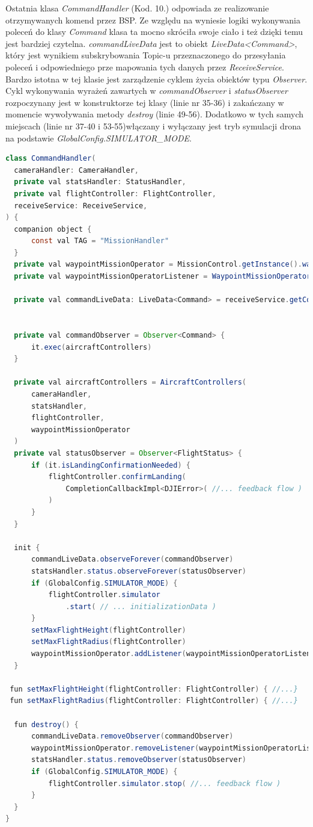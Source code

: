 Ostatnia klasa \textit{CommandHandler} (Kod. 10.) odpowiada ze realizowanie otrzymywanych komend przez BSP. Ze względu na wyniesie logiki wykonywania poleceń do klasy \textit{Command} klasa ta mocno skróciła swoje ciało i też dzięki temu jest bardziej czytelna. \textit{commandLiveData} jest to obiekt \textit{LiveData<Command>}, który jest wynikiem subskrybowania Topic-u przeznaczonego do przesyłania poleceń i odpowiedniego prze mapowania tych danych przez \textit{ReceiveService}. Bardzo istotna w tej klasie jest zarządzenie cyklem życia obiektów typu \textit{Observer}. Cykl wykonywania wyrażeń zawartych w \textit{commandObserver} i \textit{statusObserver} rozpoczynany jest w konstruktorze tej klasy (linie nr 35-36) i zakańczany w momencie wywoływania metody \textit{destroy} (linie 49-56). Dodatkowo w tych samych miejscach (linie nr 37-40 i 53-55)włączany i wyłączany jest tryb symulacji drona na podstawie \textit{GlobalConfig.SIMULATOR\_MODE}.

\begin{lstlisting}[language=Java, caption=Klasa \textit{CommandHandler}]
class CommandHandler(
  cameraHandler: CameraHandler,
  private val statsHandler: StatusHandler,
  private val flightController: FlightController,
  receiveService: ReceiveService,
) {
  companion object {
      const val TAG = "MissionHandler"
  }
  private val waypointMissionOperator = MissionControl.getInstance().waypointMissionOperator
  private val waypointMissionOperatorListener = WaypointMissionOperatorListenerImpl()

  private val commandLiveData: LiveData<Command> = receiveService.getCommand()


  private val commandObserver = Observer<Command> {
      it.exec(aircraftControllers)
  }

  private val aircraftControllers = AircraftControllers(
      cameraHandler,
      statsHandler,
      flightController,
      waypointMissionOperator
  )
  private val statusObserver = Observer<FlightStatus> {
      if (it.isLandingConfirmationNeeded) {
          flightController.confirmLanding(
              CompletionCallbackImpl<DJIError>( //... feedback flow )
          )
      }
  }

  init {
      commandLiveData.observeForever(commandObserver)
      statsHandler.status.observeForever(statusObserver)
      if (GlobalConfig.SIMULATOR_MODE) {
          flightController.simulator
              .start( // ... initializationData )
      }
      setMaxFlightHeight(flightController)
      setMaxFlightRadius(flightController)
      waypointMissionOperator.addListener(waypointMissionOperatorListener)
  }

 fun setMaxFlightHeight(flightController: FlightController) { //...}
 fun setMaxFlightRadius(flightController: FlightController) { //...}

  fun destroy() {
      commandLiveData.removeObserver(commandObserver)
      waypointMissionOperator.removeListener(waypointMissionOperatorListener)
      statsHandler.status.removeObserver(statusObserver)
      if (GlobalConfig.SIMULATOR_MODE) {
          flightController.simulator.stop( //... feedback flow )
      }
  }
}
\end{lstlisting}

